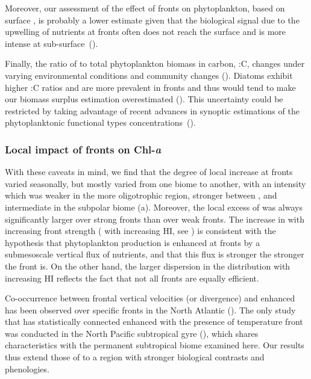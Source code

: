 Moreover, our assessment of the effect of fronts on phytoplankton, based on surface , is probably a lower estimate given that the biological signal due to the upwelling of nutrients at fronts often does not reach the surface and is more intense at sub-surface~(\cite{mourino_2004, ruiz_2019}).

Finally, the ratio of  to total phytoplankton biomass in carbon, :C, changes under varying environmental conditions and community changes (\cite{behrenfeld_2015, halsey_2015, inomura_2022}).
Diatoms exhibit higher :C ratios and are more prevalent in fronts and thus would tend to make our biomass surplus estimation overestimated (\cite{treguer_2018}).
This uncertainty could be restricted by taking advantage of recent advances in synoptic estimations of the phytoplanktonic functional types concentrations~(\cite{elhourany_2019}).

\subsubsection{Local impact of fronts on Chl-\textit{a}}

With these caveats in mind, we find that the degree of local  increase at fronts varied seasonally, but mostly varied from one biome to another, with an intensity which was weaker in the more oligotrophic region, stronger between , and intermediate in the subpolar biome (a).
Moreover, the local excess of  was always significantly larger over strong fronts than over weak fronts.
The increase in  with increasing front strength ( with increasing HI, see ) is consistent with the hypothesis that phytoplankton production is enhanced at fronts by a submesoscale vertical flux of nutrients, and that this flux is stronger the stronger the front is.
On the other hand, the larger dispersion in the  distribution with increasing HI reflects the fact that not all fronts are equally efficient.

Co-occurrence between frontal vertical velocities (or divergence) and enhanced  has been observed over specific fronts in the North Atlantic (\cite{mourino_2004, allen_2005, lehahn_2007}).
The only study that has statistically connected enhanced  with the presence of temperature front was conducted in the North Pacific subtropical gyre (\cite{liu_2016}), which shares characteristics with the permanent subtropical biome examined here.
Our results thus extend those of \textcite{liu_2016} to a region with stronger biological contrasts and phenologies.

